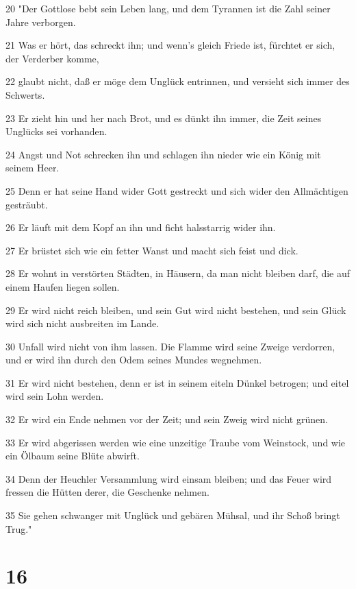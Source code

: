 \par 20 "Der Gottlose bebt sein Leben lang, und dem Tyrannen ist die Zahl seiner Jahre verborgen.
\par 21 Was er hört, das schreckt ihn; und wenn's gleich Friede ist, fürchtet er sich, der Verderber komme,
\par 22 glaubt nicht, daß er möge dem Unglück entrinnen, und versieht sich immer des Schwerts.
\par 23 Er zieht hin und her nach Brot, und es dünkt ihn immer, die Zeit seines Unglücks sei vorhanden.
\par 24 Angst und Not schrecken ihn und schlagen ihn nieder wie ein König mit seinem Heer.
\par 25 Denn er hat seine Hand wider Gott gestreckt und sich wider den Allmächtigen gesträubt.
\par 26 Er läuft mit dem Kopf an ihn und ficht halsstarrig wider ihn.
\par 27 Er brüstet sich wie ein fetter Wanst und macht sich feist und dick.
\par 28 Er wohnt in verstörten Städten, in Häusern, da man nicht bleiben darf, die auf einem Haufen liegen sollen.
\par 29 Er wird nicht reich bleiben, und sein Gut wird nicht bestehen, und sein Glück wird sich nicht ausbreiten im Lande.
\par 30 Unfall wird nicht von ihm lassen. Die Flamme wird seine Zweige verdorren, und er wird ihn durch den Odem seines Mundes wegnehmen.
\par 31 Er wird nicht bestehen, denn er ist in seinem eiteln Dünkel betrogen; und eitel wird sein Lohn werden.
\par 32 Er wird ein Ende nehmen vor der Zeit; und sein Zweig wird nicht grünen.
\par 33 Er wird abgerissen werden wie eine unzeitige Traube vom Weinstock, und wie ein Ölbaum seine Blüte abwirft.
\par 34 Denn der Heuchler Versammlung wird einsam bleiben; und das Feuer wird fressen die Hütten derer, die Geschenke nehmen.
\par 35 Sie gehen schwanger mit Unglück und gebären Mühsal, und ihr Schoß bringt Trug."

\chapter{16}

